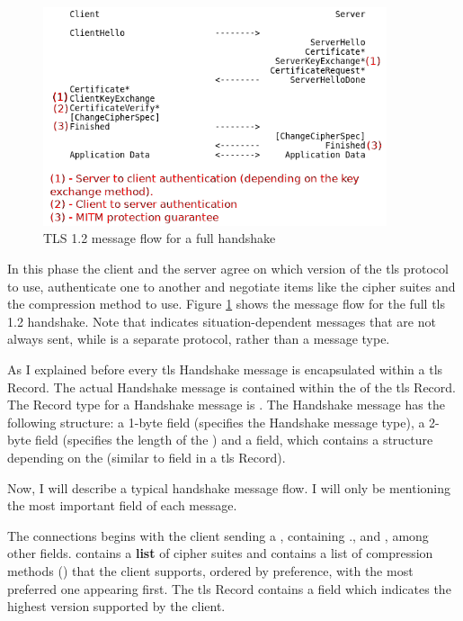 \documentclass{llncs}
\begin{document}
\begin{figure}
\centering
\includegraphics[width=0.9\textwidth]{img/tls-12-full-handshake2.png}
\caption{\label{fig:tls-12-handshake} TLS 1.2 message flow for a full handshake}
\end{figure}


In this phase the client and the server agree on which version of the \gls{tls}
protocol to use, authenticate one to another and negotiate items like
the cipher suites and the compression method to use. Figure \ref{fig:tls-12-handshake} shows the message flow for the
full \gls{tls} 1.2 handshake. Note that \codeword{*} indicates situation-dependent
messages that are not always sent, while  is a separate
protocol, rather than a message type.

As I explained before every \gls{tls} Handshake message is encapsulated within
a \gls{tls} Record. The actual Handshake message is contained within the
 of the \gls{tls} Record. The Record type for a Handshake
message is . The Handshake message has the following structure:
a 1-byte  field (specifies the Handshake message type),
a 2-byte  field (specifies the length of the )
and a  field, which contains a structure depending on the
 (similar to  field in a \gls{tls} Record).

Now, I will describe a typical handshake message flow. I will only be mentioning
the most important field of each message.

The connections begins with the client sending a , containing
.,  and ,
among other fields.
 contains a \textbf{list} of cipher suites and 
contains a list of compression methods () that the
client supports, ordered by preference, with the most preferred one appearing first.
The \gls{tls} Record contains a   field which
indicates the highest version supported by the client.
\end{document}
